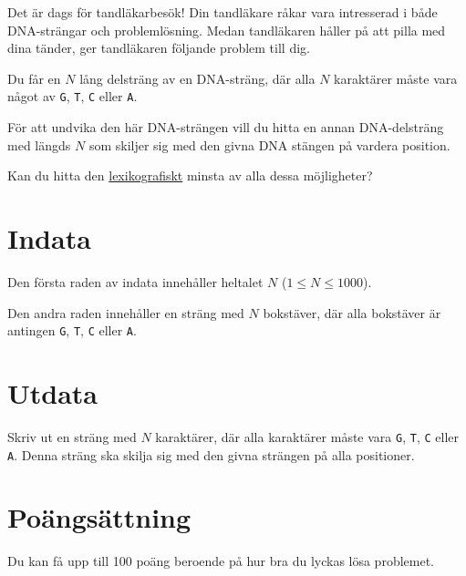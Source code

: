 \noindent
Det är dags för tandläkarbesök! Din tandläkare råkar vara intresserad i både DNA-strängar och problemlösning. 
Medan tandläkaren håller på att pilla med dina tänder, ger tandläkaren följande problem till dig.

Du får en $N$ lång delsträng av en DNA-sträng, där alla $N$ karaktärer måste vara något av \texttt{G}, \texttt{T}, \texttt{C} eller \texttt{A}.

För att undvika den här DNA-strängen vill du hitta en annan DNA-delsträng med längds $N$ som skiljer sig med den givna DNA stängen på vardera position.

Kan du hitta den \href{https://en.wikipedia.org/wiki/Lexicographic_order}{lexikografiskt} minsta av alla dessa möjligheter? 


\section*{Indata}
\noindent
Den första raden av indata innehåller heltalet $N$ ($1 \leq N \leq 1000$).

Den andra raden innehåller en sträng med $N$ bokstäver, där alla bokstäver är antingen \texttt{G}, \texttt{T}, \texttt{C} eller \texttt{A}.

\section*{Utdata}
\noindent
Skriv ut en sträng med $N$ karaktärer, där alla karaktärer måste vara \texttt{G}, \texttt{T}, \texttt{C} eller \texttt{A}. 
Denna sträng ska skilja sig med den givna strängen på alla positioner.



\section*{Poängsättning}
Du kan få upp till 100 poäng beroende på hur bra du lyckas lösa problemet.

